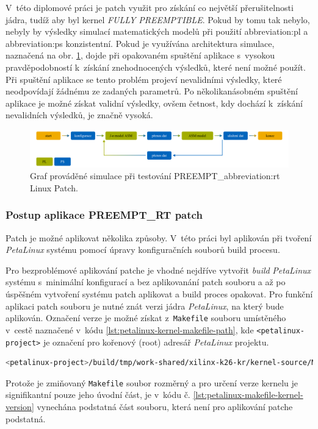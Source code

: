 \documentclass[a4paper, twoside, 11pt]{article}
\newcommand{\fbar}{\FloatBarrier}
\begin{document}
			V~této diplomové práci je patch využit pro získání co největší přerušitelnosti jádra, tudíž aby byl kernel \textit{FULLY PREEMPTIBLE}. Pokud by tomu tak nebylo, nebyly by výsledky simulací matematických modelů při použití \gls{abbreviation:pl} a \gls{abbreviation:ps} konzistentní. Pokud je využívána architektura simulace, naznačená na obr. \ref{fig:rt-simulation-graph}, dojde při opakovaném spuštění aplikace s~vysokou pravděpodobností k~získání znehodnocených výsledků, které není možné použít. Při spuštění aplikace se tento problém projeví nevalidními výsledky, které neodpovídají žádnému ze zadaných parametrů. Po několikanásobném spuštění aplikace je možné získat validní výsledky, ovšem četnost, kdy dochází k~získání nevalidních výsledků, je značně vysoká.

			\begin{figure}[H]
				\centering
					\includegraphics[width=1\textwidth]{src/pdf/rt-simulation-graph.pdf} 
					\caption{Graf prováděné simulace při testování PREEMPT\_\gls{abbreviation:rt} Linux Patch.}
					\label{fig:rt-simulation-graph}
			\end{figure}
			
			\fbar
			\subsubsection{Postup aplikace PREEMPT\_RT patch}\label{subsubsec:postup-aplikace-preempt-rt-patch}
				Patch je možné aplikovat několika způsoby. V~této práci byl aplikován při tvoření \textit{PetaLinux} systému pomocí úpravy konfiguračních souborů build procesu.\par
				Pro bezproblémové aplikování patche je vhodné nejdříve vytvořit \textit{build} \textit{PetaLinux} systému s~minimální konfigurací a bez aplikovanání patch souboru a až po úspěšném vytvoření systému patch aplikovat a build proces opakovat. Pro funkční aplikaci patch souboru je nutné znát verzi jádra \textit{PetaLinux}, na který bude aplikován. Označení verze je možné získat z~\texttt{Makefile} souboru umístěného v~cestě naznačené v~kódu \ref{lst:petalinux-kernel-makefile-path}, kde \texttt{<petalinux-project>} je označení pro kořenový (root) adresář \textit{PetaLinux} projektu.

				\begin{lstlisting}[language={sh}, caption={Cesta Makefile souboru, ze kterého je možné získat označení verze jádra systému PetaLinux.}, label= {lst:petalinux-kernel-makefile-path}]
<petalinux-project>/build/tmp/work-shared/xilinx-k26-kr/kernel-source/Makefile\end{lstlisting}
				Protože je zmiňovaný \texttt{Makefile} soubor rozměrný a pro určení verze kernelu je signifikantní pouze jeho úvodní část, je v~kódu č. \ref{lst:petalinux-makefile-kernel-version} vynechána podstatná část souboru, která není pro aplikování patche podstatná.
\end{document}
